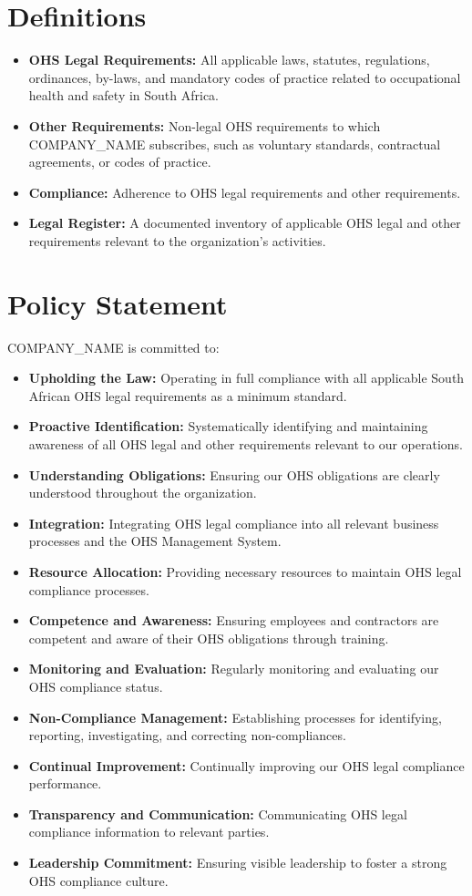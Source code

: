 \documentclass[12pt]{article}
\begin{document}
\section{Definitions}
\begin{itemize}
    \item \textbf{OHS Legal Requirements:} All applicable laws, statutes, regulations, ordinances, by-laws, and mandatory codes of practice related to occupational health and safety in South Africa.
    \item \textbf{Other Requirements:} Non-legal OHS requirements to which {{COMPANY_NAME}} subscribes, such as voluntary standards, contractual agreements, or codes of practice.
    \item \textbf{Compliance:} Adherence to OHS legal requirements and other requirements.
    \item \textbf{Legal Register:} A documented inventory of applicable OHS legal and other requirements relevant to the organization's activities.
\end{itemize}

\section{Policy Statement}
{{COMPANY_NAME}} is committed to:
\begin{itemize}
    \item \textbf{Upholding the Law:} Operating in full compliance with all applicable South African OHS legal requirements as a minimum standard.
    \item \textbf{Proactive Identification:} Systematically identifying and maintaining awareness of all OHS legal and other requirements relevant to our operations.
    \item \textbf{Understanding Obligations:} Ensuring our OHS obligations are clearly understood throughout the organization.
    \item \textbf{Integration:} Integrating OHS legal compliance into all relevant business processes and the OHS Management System.
    \item \textbf{Resource Allocation:} Providing necessary resources to maintain OHS legal compliance processes.
    \item \textbf{Competence and Awareness:} Ensuring employees and contractors are competent and aware of their OHS obligations through training.
    \item \textbf{Monitoring and Evaluation:} Regularly monitoring and evaluating our OHS compliance status.
    \item \textbf{Non-Compliance Management:} Establishing processes for identifying, reporting, investigating, and correcting non-compliances.
    \item \textbf{Continual Improvement:} Continually improving our OHS legal compliance performance.
    \item \textbf{Transparency and Communication:} Communicating OHS legal compliance information to relevant parties.
    \item \textbf{Leadership Commitment:} Ensuring visible leadership to foster a strong OHS compliance culture.
\end{itemize}
\end{document}
